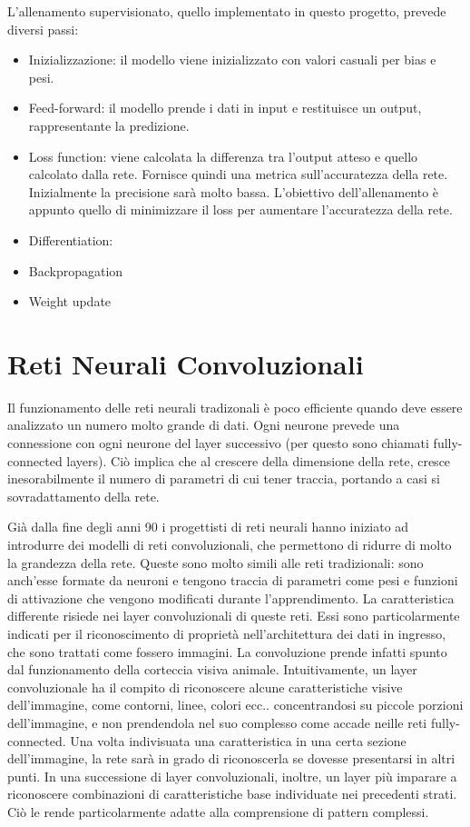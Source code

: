 \documentclass{article}
\begin{document}
L'allenamento supervisionato, quello implementato in questo progetto, prevede diversi passi:
\begin{itemize}
\item Inizializzazione: il modello viene inizializzato con valori casuali per bias e pesi. 
\item Feed-forward: il modello prende i dati in input e restituisce un output, rappresentante la predizione.
\item Loss function: viene calcolata la differenza tra l'output atteso e quello calcolato dalla rete. Fornisce quindi una metrica sull'accuratezza della rete.  Inizialmente la precisione sarà molto bassa. L'obiettivo dell'allenamento è appunto quello di minimizzare il loss per aumentare l'accuratezza della rete. 
\item Differentiation: 
\item Backpropagation 
\item Weight update 
\end{itemize}

\section{Reti Neurali Convoluzionali}
Il funzionamento delle reti neurali tradizonali è poco efficiente quando deve essere analizzato un numero molto grande di dati. Ogni neurone prevede una connessione con ogni neurone del layer successivo (per questo sono chiamati fully-connected layers). Ciò implica che al crescere della dimensione della rete, cresce inesorabilmente il numero di parametri di cui tener traccia, portando a casi si sovradattamento della rete.

Già dalla fine degli anni 90 i progettisti di reti neurali hanno iniziato ad introdurre dei modelli di reti convoluzionali, che permettono di ridurre di molto la grandezza della rete. Queste sono molto simili alle reti tradizionali: sono anch'esse formate da neuroni e tengono traccia di parametri come pesi e funzioni di attivazione che vengono modificati durante l'apprendimento. La caratteristica differente risiede nei layer convoluzionali di queste reti. Essi sono particolarmente indicati per il riconoscimento di proprietà nell'architettura dei dati in ingresso, che sono trattati come fossero immagini. La convoluzione prende infatti spunto dal funzionamento della corteccia visiva animale. Intuitivamente, un layer convoluzionale ha il compito di riconoscere alcune caratteristiche visive dell'immagine, come contorni, linee, colori ecc.. concentrandosi su piccole porzioni dell'immagine, e non prendendola nel suo complesso come accade neille reti fully-connected. Una volta indivisuata una caratteristica in una certa sezione dell'immagine, la rete sarà in grado di riconoscerla se dovesse presentarsi in altri punti. In una successione di layer convoluzionali, inoltre, un layer più imparare a riconoscere combinazioni di caratteristiche base individuate nei precedenti strati. Ciò le rende particolarmente adatte alla comprensione di pattern complessi. 
\end{document}
